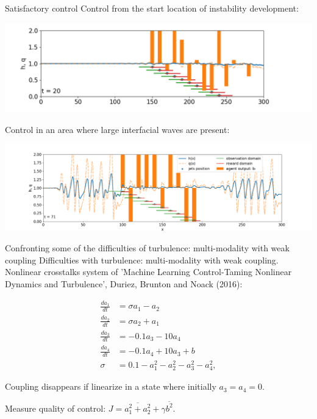 \documentclass{beamer}
\begin{document}
\begin{frame}{Satisfactory control}
    Control from the start location of instability development:
    
\begin{center}
  \includegraphics[width=.75\textwidth]{Figures/trained}
\end{center}
    
    Control in an area where large interfacial waves are present:
    
\begin{center}
  \includegraphics[width=.85\textwidth]{Figures/figure5-1}
\end{center}
\end{frame}

\begin{frame}{Confronting some of the difficulties of turbulence: multi-modality with weak coupling}
    Difficulties with turbulence: multi-modality with weak coupling. \\

    Nonlinear crosstalks system of 'Machine Learning Control-Taming Nonlinear Dynamics and Turbulence', Duriez, Brunton and Noack (2016):

\begin{align}
    \frac{da_1}{dt} &= \sigma a_1 - a_2 \\
    \frac{da_2}{dt} &= \sigma a_2 + a_1 \\
    \frac{da_3}{dt} &= -0.1 a_3 - 10 a_4 \\
    \frac{da_4}{dt} &= -0.1 a_4 + 10 a_3 + b \\
    \sigma &= 0.1 - a_1^2 - a_2^2 - a_3^2 -a_4^2,
    \label{eqn:cross_talks}
\end{align}

Coupling disappears if linearize in a state where initially $a_3 = a_4 = 0$.

Measure quality of control: $J = \overline{a_1^2 + a_2^2} + \gamma \overline{b^2}$.
    
\end{frame}
\end{document}
